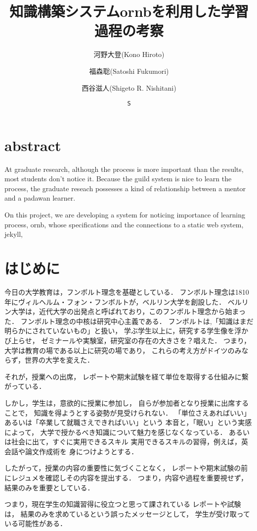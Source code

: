 \documentclass{jsarticle}
\author[1]{河野大登(Kono Hiroto)}
\author[1]{福森聡(Satoshi Fukumori)}
\author[1]{西谷滋人(Shigeto R. Nishitani)}
\affil[1]{関西学院大学理工学部情報科学科(三田市)．Department of Informatics, Kwansei Gakuin University(Sanda-shi, Hyogo).}
\author{\texttt{S}}
\date{}
\title{知識構築システムornbを利用した学習過程の考察}
\begin{document}
\maketitle


\section{abstract}
\label{sec:org5fcc89d}
At graduate research, 
although the process is more important than the results,
most students don't notice it.
Because the guild system is nice to learn the process,
the graduate reseach possesses a kind of
relationship between 
a mentor and a padawan learner.

On this project, 
we are developing a system for
noticing importance of learning process,
ornb, whose specifications and the 
connections to a static web system, jekyll,

\section{はじめに}
\label{sec:org967ef3c}
今日の大学教育は，フンボルト理念を基礎としている．
フンボルト理念は1810年にヴィルヘルム・フォン・フンボルトが，ベルリン大学を創設した．
ベルリン大学は，近代大学の出発点と呼ばれており，このフンボルト理念から始まった．
フンボルト理念の中核は研究中心主義である．
フンボルトは,「知識はまだ明らかにされていないもの」と扱い，
学ぶ学生以上に，研究する学生像を浮かび上らせ，
ゼミナールや実験室，研究室の存在の大きさを？唱えた．
つまり，大学は教育の場である以上に研究の場であり，
これらの考え方がドイツのみならず，世界の大学を変えた．

それが，授業への出席，
レポートや期末試験を経て単位を取得する仕組みに繋がっている．

しかし，学生は，意欲的に授業に参加し，
自らが参加者となり授業に出席することで，
知識を得ようとする姿勢が見受けられない．
「単位さえあればいい」あるいは「卒業して就職さえできればいい」という
本音と，「眠い」という実感によって，
大学で授かるべき知識について魅力を感じなくなっている．
あるいは社会に出て，すぐに実用できるスキル
実用できるスキルの習得，例えば，英会話や論文作成術を
身につけようとする．

したがって，授業の内容の重要性に気づくことなく，
レポートや期末試験の前にレジュメを確認しその内容を提出する．
つまり，内容や過程を重要視せず，結果のみを重要としている．

つまり，現在学生の知識習得に役立つと思って課されている
レポートや試験は，
結果のみを求めているという誤ったメッセージとして，
学生が受け取っている可能性がある．
\end{document}
